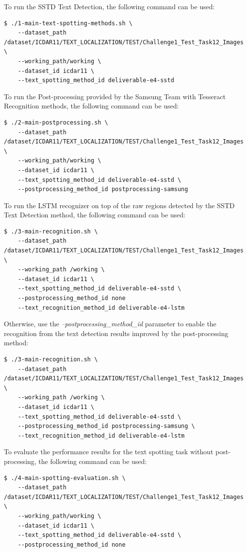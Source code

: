 To run the SSTD Text Detection, the following command can be used:
\begin{lstlisting}[style=fancyterminal]
 $ ./1-main-text-spotting-methods.sh \
    --dataset_path /dataset/ICDAR11/TEXT_LOCALIZATION/TEST/Challenge1_Test_Task12_Images \
    --working_path/working \
    --dataset_id icdar11 \
    --text_spotting_method_id deliverable-e4-sstd
\end{lstlisting}

To run the Post-processing provided by the Samsung Team with Tesseract Recognition methods, the following command can be used:
\begin{lstlisting}[style=fancyterminal]
 $ ./2-main-postprocessing.sh \
    --dataset_path /dataset/ICDAR11/TEXT_LOCALIZATION/TEST/Challenge1_Test_Task12_Images \
    --working_path/working \
    --dataset_id icdar11 \
    --text_spotting_method_id deliverable-e4-sstd \
    --postprocessing_method_id postprocessing-samsung
\end{lstlisting}

To run the LSTM recognizer on top of the raw regions detected by the SSTD Text Detection method, the following command can be used:
\begin{lstlisting}[style=fancyterminal]
 $ ./3-main-recognition.sh \
    --dataset_path /dataset/ICDAR11/TEXT_LOCALIZATION/TEST/Challenge1_Test_Task12_Images \ 
    --working_path /working \ 
    --dataset_id icdar11 \ 
    --text_spotting_method_id deliverable-e4-sstd \
    --postprocessing_method_id none
    --text_recognition_method_id deliverable-e4-lstm
\end{lstlisting}

Otherwise, use the \textit{--postprocessing\_method\_id} parameter to enable the recognition from the text detection results improved by the post-processing method:

\begin{lstlisting}[style=fancyterminal]
 $ ./3-main-recognition.sh \
    --dataset_path /dataset/ICDAR11/TEXT_LOCALIZATION/TEST/Challenge1_Test_Task12_Images \ 
    --working_path /working \ 
    --dataset_id icdar11 \ 
    --text_spotting_method_id deliverable-e4-sstd \ 
    --postprocessing_method_id postprocessing-samsung \ 
    --text_recognition_method_id deliverable-e4-lstm
\end{lstlisting}

To evaluate the performance results for the text spotting task without post-processing, the following command can be used:
\begin{lstlisting}[style=fancyterminal]
 $ ./4-main-spotting-evaluation.sh \
    --dataset_path /dataset/ICDAR11/TEXT_LOCALIZATION/TEST/Challenge1_Test_Task12_Images \
    --working_path/working \
    --dataset_id icdar11 \
    --text_spotting_method_id deliverable-e4-sstd \
    --postprocessing_method_id none
\end{lstlisting}

